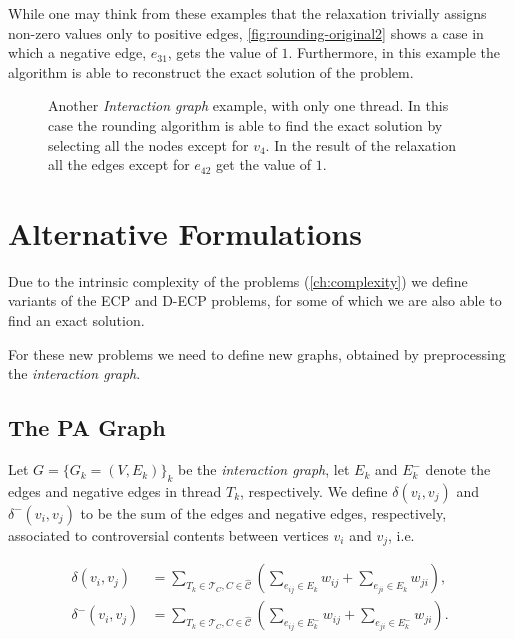 While one may think from these examples that the relaxation trivially assigns
non-zero values only to positive edges, \autoref{fig:rounding-original2} shows
a case in which a negative edge, $e_{31}$, gets the value of $1$. Furthermore,
in this example the algorithm is able to reconstruct the exact solution of the problem.

\begin{figure}
	\centering
	\caption[Example of rounding algorithm finding the exact solution]{Another
		\emph{Interaction graph} example, with only one thread. In
		this case the rounding algorithm is able to find the exact solution by
		selecting all the nodes except for $v_4$. In the result of the
		relaxation all the edges except for $e_{42}$ get the value of $1$.}%
	\label{fig:rounding-original2}
\end{figure}

\section{Alternative Formulations}%
\label{sec:alternative-formulations}

Due to the intrinsic complexity of the problems
(\autoref{ch:complexity}) we define variants of
the \acrshort{ECP} and \acrshort{D-ECP} problems, for some of which we are also able to find an exact solution.

For these new problems we need to define new graphs, obtained by preprocessing
the \emph{interaction graph}.

\subsection{The \acrlong{PA} Graph}%
\label{sub:pa-graph}

Let $G = \{G_k = (V,E_k) \}_k$ be the \emph{interaction graph}, let $E_k$ and
$E^-_k$ denote the edges and negative edges in thread $T_k$,
respectively. We define $\delta(v_{i}, v_{j})$ and
$\delta^{-} (v_{i}, v_{j})$ to be the sum of the edges and negative edges, respectively,
associated to controversial contents between vertices $v_{i} $ and $v_{j}
$, i.e.\

\begin{align}
	\label{eq:}
	\delta(v_{i}, v_{j})   & = \sum^{}_{T_k \in \mathcal{T}_C, C \in
	\mathcal{\hat{C}} } ( \sum^{}_{e_{ij} \in E_k} w_{ij} + \sum^{}_{e_{ji} \in
	E_k} w_{ji} ),
	\\
	\delta^-(v_{i}, v_{j}) & = \sum^{}_{T_k \in \mathcal{T}_C, C \in
	\mathcal{\hat{C}} } ( \sum^{}_{e_{ij} \in E^-_k} w_{ij} + \sum^{}_{e_{ji} \in
	E^-_k} w_{ji} ).
\end{align}

